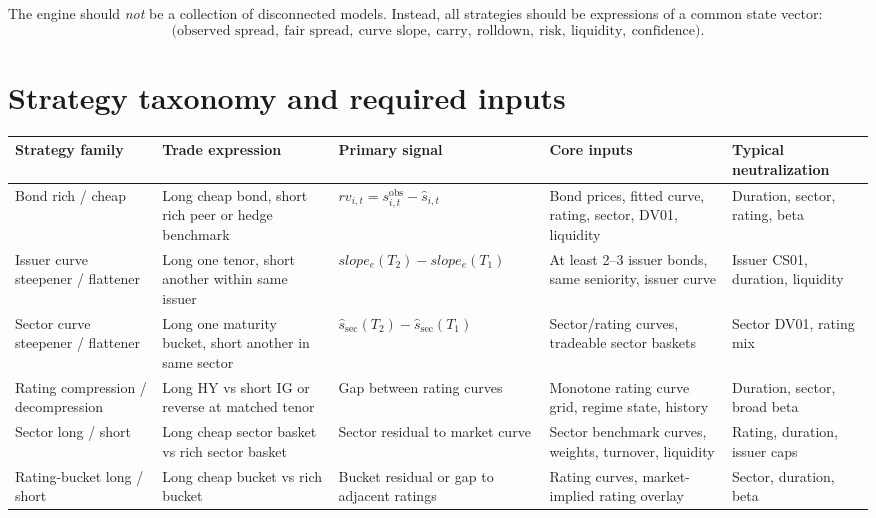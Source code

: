 \documentclass[11pt]{article}
\begin{document}
The engine should \emph{not} be a collection of disconnected models. Instead, all strategies should be expressions of a common state vector:
\[
\bigl(\text{observed spread},\ \text{fair spread},\ \text{curve slope},\ \text{carry},\ \text{rolldown},\ \text{risk},\ \text{liquidity},\ \text{confidence}\bigr).
\]

\section{Strategy taxonomy and required inputs}

\small
\begin{longtable}{L{2.15cm}L{2.8cm}L{2.35cm}L{3.4cm}L{2.1cm}}
\textbf{\color{Accent}Strategy family} &
\textbf{\color{Accent}Trade expression} &
\textbf{\color{Accent}Primary signal} &
\textbf{\color{Accent}Core inputs} &
\textbf{\color{Accent}Typical neutralization} \\
\toprule
\endhead

Bond rich / cheap &
Long cheap bond, short rich peer or hedge benchmark &
$rv_{i,t}=s^{\mathrm{obs}}_{i,t}-\hat s_{i,t}$ &
Bond prices, fitted curve, rating, sector, DV01, liquidity &
Duration, sector, rating, beta \\

Issuer curve steepener / flattener &
Long one tenor, short another within same issuer &
$slope_e(T_2)-slope_e(T_1)$ &
At least 2--3 issuer bonds, same seniority, issuer curve &
Issuer CS01, duration, liquidity \\

Sector curve steepener / flattener &
Long one maturity bucket, short another in same sector &
$\hat s_{\mathrm{sec}}(T_2)-\hat s_{\mathrm{sec}}(T_1)$ &
Sector/rating curves, tradeable sector baskets &
Sector DV01, rating mix \\

Rating compression / decompression &
Long HY vs short IG or reverse at matched tenor &
Gap between rating curves &
Monotone rating curve grid, regime state, history &
Duration, sector, broad beta \\

Sector long / short &
Long cheap sector basket vs rich sector basket &
Sector residual to market curve &
Sector benchmark curves, weights, turnover, liquidity &
Rating, duration, issuer caps \\

Rating-bucket long / short &
Long cheap bucket vs rich bucket &
Bucket residual or gap to adjacent ratings &
Rating curves, market-implied rating overlay &
Sector, duration, beta \\


\end{longtable}
\end{document}
